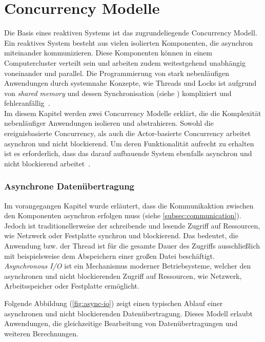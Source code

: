 \section{Concurrency Modelle}
Die Basis eines reaktiven Systems ist das zugrundeliegende Concurrency Modell. Ein reaktives System besteht aus vielen isolierten Komponenten, die asynchron miteinander kommunizieren. Diese Komponenten können in einem Computercluster verteilt sein und arbeiten zudem weitestgehend unabhängig voneinander und parallel. Die Programmierung von stark nebenläufigen Anwendungen durch systemnahe Konzepte, wie Threads und Locks ist aufgrund von \textit{shared memory} und dessen Synchronisation (siehe ) kompliziert und fehleranfällig~\cite[S.~72]{erb_concurrent_2012}.\\
Im diesem Kapitel werden zwei Concurrency Modelle erklärt, die die Komplexität nebenläufiger Anwendungen isolieren und abstrahieren. Sowohl die ereignisbasierte Concurrency, als auch die Actor-basierte Concurrency arbeitet asynchron und nicht blockierend. Um deren Funktionalität aufrecht zu erhalten ist es erforderlich, dass das darauf aufbauende System ebenfalls asynchron und nicht blockierend arbeitet~\cite[S.~171]{kuhn_reactive_2015}.

\subsubsection{Asynchrone Datenübertragung}\label{subsec:async-io}
Im vorangegangen Kapitel wurde erläutert, dass die Kommunikaktion zwischen den Komponenten asynchron erfolgen muss (siehe \ref{subsec:communication}). Jedoch ist traditionellerweise der schreibende und lesende Zugriff auf Ressourcen, wie Netzwerk oder Festplatte synchron und blockierend. Das bedeutet, die Anwendung bzw. der Thread ist für die gesamte Dauer des Zugriffs ausschließlich mit beispielsweise dem Abspeichern einer großen Datei beschäftigt.\\
\textit{Asynchronous I/O} ist ein Mechanismus moderner Betriebsysteme, welcher den asynchronen und nicht blockierenden Zugriff auf Ressourcen, wie Netzwerk, Arbeitsspeicher oder Festplatte ermöglicht.

\pagebreak

Folgende Abbildung (\ref{fig:async-io}) zeigt einen typischen Ablauf einer asynchronen und nicht blockierenden Datenübertragung. Dieses Modell erlaubt Anwendungen, die gleichzeitige Bearbeitung von Datenübertragungen und weiteren Berechnungen. 

